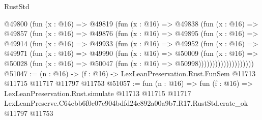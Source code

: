 \begin{lexlean}{RustStd}
\begin{coremodule}
              @49800
                (fun (x : @16) =>
                @49819
                  (fun (x : @16) =>
                  @49838
                    (fun (x : @16) =>
                    @49857
                      (fun (x : @16) =>
                      @49876
                        (fun (x : @16) =>
                        @49895
                          (fun (x : @16) =>
                          @49914
                            (fun (x : @16) =>
                            @49933
                              (fun (x : @16) =>
                              @49952
                                (fun (x : @16) =>
                                @49971
                                  (fun (x : @16) =>
                                  @49990
                                    (fun (x : @16) =>
                                    @50009
                                      (fun (x : @16) =>
                                      @50028
                                        (fun (x : @16) =>
                                        @50047 (fun (x : @16) => @50998))))))))))))))))))))
@51047 := (n : @16) ->
  (f : @16) -> LexLeanPreservation.Rust.FunSem @11713 @11715 @11717 @11797 @11753
@51057 := fun (n : @16) =>
  fun (f : @16) =>
  LexLeanPreservation.Rust.simulate
    @11713
    @11715
    @11717
    LexLeanPreserve.C64ebb6f0c07e904bdfd24c892a00a9b7.R17.RustStd.crate_ok
    @11797
    @11753
\end{coremodule}
\end{lexlean}

